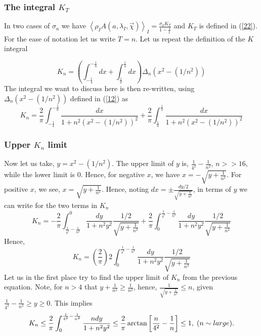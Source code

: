 \documentclass{appolb}
\begin{document}
\subsubsection{The integral $K_T$}
In two cases of $\sigma_a$ we have $\left \langle \rho_{I} A(a,\lambda_{I},\vec{\chi})\right\rangle_{I}=\frac{\sigma_a K_T}{1-\frac{4}{t}}$ and $K_T$ is defined in (\ref{22}). For the ease of notation let us write $T=n$. Let us repeat the definition of the $K$ integral 

\begin{equation}
K_n=\left( \int_{-\frac{1}{4}}^{-\frac{1}{n}}dx+\int_{\frac{1}{n}}^{\frac{1}{4}} dx \right)\Delta_n\left(x^2 - (1/n^2) \right)
\end{equation}
The integral we want to discuss here is then re-written, using $\Delta_n\left(x^2 - (1/n^2) \right)$ defined in (\ref{12})  as
\begin{equation}\label{K16}
K_n=\frac{2}{\pi}\int_{-\frac{1}{4}}^{-\frac{1}{n}} \frac{dx}{1+n^2(x^2-(1/n^2))^2}+\frac{2}{\pi}\int_{\frac{1}{n}}^{\frac{1}{4}} \frac{dx}{1+n^2(x^2-(1/n^2))^2}
\end{equation}

\subsubsection{Upper $K_n$ limit}
Now let us take, $y=x^2-(1/n^2)$. The upper limit of $y$ is, $\frac{1}{4^2}-\frac{1}{n^2}$, $n>>16$,  while the lower limit is $0$. 
Hence, for negative $x$, we have $x=-\sqrt{y+\frac{1}{n^2}}$. For positive $x$, we see, $x=\sqrt{y+\frac{1}{n^2}}$. Hence, noting $dx=\pm \frac{dy/2}{\sqrt{y+\frac{1}{n^2}}}$, in terms of $y$ we can write for the two terms in $K_n$
\begin{equation}
K_n=-\frac{2}{\pi}\int_{\frac{1}{4^2}-\frac{1}{n^2}}^0\frac{dy}{1+n^2y^2}\frac{1/2}{\sqrt{y+\frac{1}{n^2}}}+\frac{2}{\pi}\int^{\frac{1}{4^2}-\frac{1}{n^2}}_0\frac{dy}{1+n^2y^2}\frac{1/2}{\sqrt{y+\frac{1}{n^2}}}
\end{equation}
Hence,
\begin{equation}\label{K17}
K_n= \left(\frac{2}{\pi}\right) 2 \int_{0}^{\frac{1}{4^2}-\frac{1}{n^2}}\frac{dy}{1+n^2y^2}\frac{1/2}{\sqrt{y+\frac{1}{n^2}}}
\end{equation}
Let us in the first place try to find the upper limit of $K_n$ from the previous equation. Note, for $n>4$ that $y+\frac{1}{n^2} \geq \frac{1}{n^2}$, hence, $\frac{1}{\sqrt{y+\frac{1}{n^2}}}\leq n$, given $\frac{1}{4^2}-\frac{1}{n^2} \geq y \geq 0$. This implies
\begin{equation}\label{K18}
K_n \leq \frac{2}{\pi} \int_{0}^{\frac{1}{4^2}-\frac{1}{n^2}} \frac{n dy}{1+n^2y^2}\leq \frac{2}{\pi} \arctan\left[ \frac{n}{4^2}-\frac{1}{n}\right]\leq 1,\hspace{0.1cm} (n \sim  large).
\end{equation}
\end{document}
